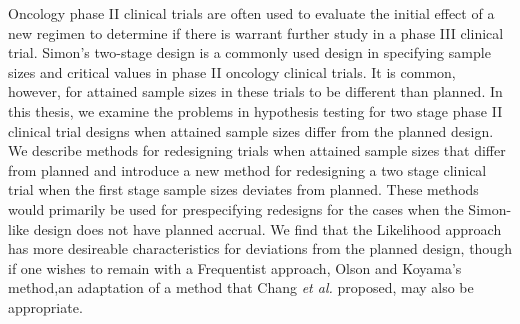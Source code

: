 \documentclass[12pt]{report}\usepackage[]{graphicx}\usepackage[]{color}
\newlength{\li}\setlength{\li}{14.48pt}
\newlength{\di}\setlength{\di}{-3.5mm}
\begin{document}
\vspace{7mm}
Oncology phase II clinical trials are often used to evaluate the initial effect of a new regimen to determine if there is warrant further study in a phase III clinical trial. Simon's two-stage design is a commonly used design in specifying sample sizes and critical values in phase II oncology clinical trials. It is common, however, for attained sample sizes in these trials to be different than planned. In this thesis, we examine the problems in hypothesis testing for two stage phase II clinical trial designs when attained sample sizes differ from the planned design. We describe methods for redesigning trials when attained sample sizes that differ from planned and introduce a new method for redesigning a two stage clinical trial when the first stage sample sizes deviates from planned. These methods would primarily be used for prespecifying redesigns for the cases when the Simon-like design does not have planned accrual. We find that the Likelihood approach has more desireable characteristics for deviations from the planned design, though if one wishes to remain with a Frequentist approach, Olson and Koyama's method,an adaptation of a method that Chang \textit{et al.} proposed, may also be appropriate.  
\newpage

\normalsize
\doublespacing
{}
\setcounter{page}{1}


\end{document}
